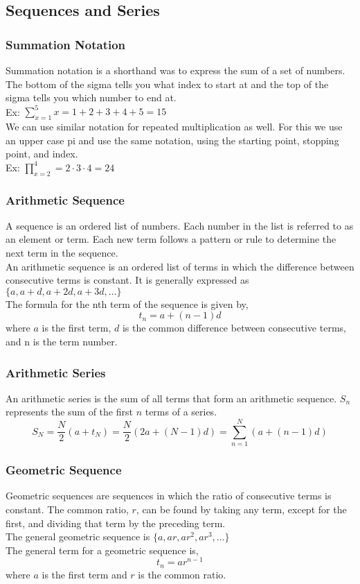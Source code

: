 \subsection{Sequences and Series}

\subsubsection{Summation Notation}
Summation notation is a shorthand was to express the sum of a set of numbers. The bottom of the sigma tells you what index to start at and the top of the sigma tells you which number to end at.\\
Ex: $\sum \limits_{x=1}^5 x=1+2+3+4+5=15$\\
We can use similar notation for repeated multiplication as well. For this we use an upper case pi and use the same notation, using the starting point, stopping point, and index.\\
Ex: $\prod \limits_{x=2}^4=2\cdot 3\cdot 4=24$

\subsubsection{Arithmetic Sequence}
A sequence is an ordered list of numbers. Each number in the list is referred to as an element or term. Each new term follows a pattern or rule to determine the next term in the sequence.\\
An arithmetic sequence is an ordered list of terms in which the difference between consecutive terms is constant. It is generally expressed as $\{a,a+d,a+2d,a+3d,\ldots\}$\\ The formula for the nth term of the sequence is given by,
$$t_n=a+(n-1)d$$
where $a$ is the first term, $d$ is the common difference between consecutive terms, and n is the term number.

\subsubsection{Arithmetic Series}
An arithmetic series is the sum of all terms that form an arithmetic sequence. $S_n$ represents the sum of the first $n$ terms of a series.
$$S_N=\frac{N}{2}(a+t_N)=\frac{N}{2}(2a+(N-1)d)=\sum \limits_{n=1}^N (a+(n-1)d)$$

\subsubsection{Geometric Sequence}
Geometric sequences are sequences in which the ratio of consecutive terms is constant. The common ratio, $r$, can be found by taking any term, except for the first, and dividing that term by the preceding term.\\
The general geometric sequence is $\{a,ar,ar^2,ar^3,\ldots\}$\\
The general term for a geometric sequence is,
$$t_n=ar^{n-1}$$
where $a$ is the first term and $r$ is the common ratio.

